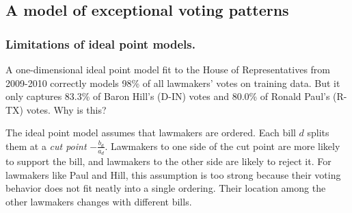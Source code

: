 \subsection{A model of exceptional voting patterns}
\label{sec:exceptional_model}

\subsubsection{Limitations of ideal point models.}

A one-dimensional ideal point model fit to the House of
Representatives from 2009-2010 correctly models 98\% of all lawmakers'
votes on training data. But it only captures 83.3\% of Baron Hill's
(D-IN) votes and 80.0\% of Ronald Paul's (R-TX) votes.  Why is this?

The ideal point model assumes that lawmakers are ordered.  Each bill
$d$ splits them at a \emph{cut point} $-\frac{b_d}{a_d}$.  Lawmakers
to one side of the cut point are more likely to support the bill, and
lawmakers to the other side are likely to reject it.  For lawmakers
like Paul and Hill, this assumption is too strong because
their voting behavior does not fit neatly into a single ordering.
Their location among the other lawmakers changes with different bills.

